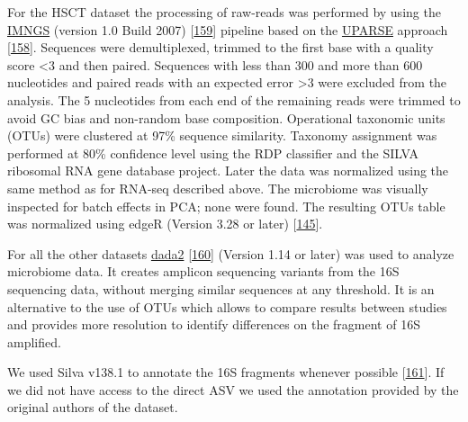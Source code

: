 \documentclass[
  12pt,
  a4paper,
  twoside,
  openright]{book}
\begin{document}
For the HSCT dataset the processing of raw-reads was performed by using the \href{https://www.imngs.org/}{IMNGS} (version 1.0 Build 2007) {[}\protect\hyperlink{ref-lagkouvardos2016}{159}{]} pipeline based on the \href{https://www.drive5.com/uparse/}{UPARSE} approach {[}\protect\hyperlink{ref-edgar2013}{158}{]}.
Sequences were demultiplexed, trimmed to the first base with a quality score \textless3 and then paired.
Sequences with less than 300 and more than 600 nucleotides and paired reads with an expected error \textgreater3 were excluded from the analysis.
The 5 nucleotides from each end of the remaining reads were trimmed to avoid GC bias and non-random base composition.
Operational taxonomic units (OTUs) were clustered at 97\% sequence similarity.
Taxonomy assignment was performed at 80\% confidence level using the RDP classifier and the SILVA ribosomal RNA gene database project.
Later the data was normalized using the same method as for RNA-seq described above.
The microbiome was visually inspected for batch effects in PCA; none were found.
The resulting OTUs table was normalized using edgeR (Version 3.28 or later) {[}\protect\hyperlink{ref-mccarthy2012}{145}{]}.

For all the other datasets \href{https://bioconductor.org/packages/dada2}{dada2} {[}\protect\hyperlink{ref-callahan2016}{160}{]} (Version 1.14 or later) was used to analyze microbiome data.
It creates amplicon sequencing variants from the 16S sequencing data, without merging similar sequences at any threshold.
It is an alternative to the use of OTUs which allows to compare results between studies and provides more resolution to identify differences on the fragment of 16S amplified.

We used Silva v138.1 to annotate the 16S fragments whenever possible {[}\protect\hyperlink{ref-quast2013}{161}{]}.
If we did not have access to the direct ASV we used the annotation provided by the original authors of the dataset.
\end{document}
